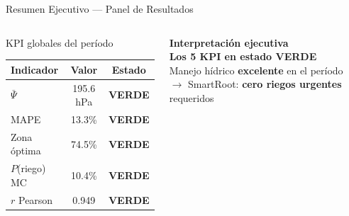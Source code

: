 \documentclass[11pt, aspectratio=169]{beamer}
\newcommand{\semverde}[1]{\textcolor{SmartGreen}{\textbf{#1}}}
\begin{document}
\begin{frame}{Resumen Ejecutivo --- Panel de Resultados}
\begin{columns}[t]
\begin{exampleblock}{KPI globales del período}
\centering
\begin{tabular}{@{}lcc@{}}
\toprule
\footnotesize\textbf{Indicador} & \footnotesize\textbf{Valor} & \footnotesize\textbf{Estado} \\
\midrule
\footnotesize$\bar{\Psi}$ & \footnotesize195.6 hPa & \semverde{\footnotesize VERDE} \\
\footnotesize MAPE & \footnotesize13.3\% & \semverde{\footnotesize VERDE} \\
\footnotesize Zona óptima & \footnotesize74.5\% & \semverde{\footnotesize VERDE} \\
\footnotesize$P$(riego) MC & \footnotesize10.4\% & \semverde{\footnotesize VERDE} \\
\footnotesize$r$ Pearson & \footnotesize0.949 & \semverde{\footnotesize VERDE} \\
\bottomrule
\end{tabular}
\end{exampleblock}

\vspace{4pt}
\begin{tcolorbox}[colback=SmartGreen!12,colframe=SmartGreen,
    arc=4pt,left=6pt,right=6pt,top=4pt,bottom=4pt]
\centering\footnotesize
\textbf{Interpretación ejecutiva}\\
\semverde{Los 5 KPI en estado VERDE}\\
Manejo hídrico \textbf{excelente} en el período\\
$\rightarrow$ SmartRoot: \textbf{cero riegos urgentes} requeridos
\end{tcolorbox}
\end{columns}
\end{frame}
\end{document}
